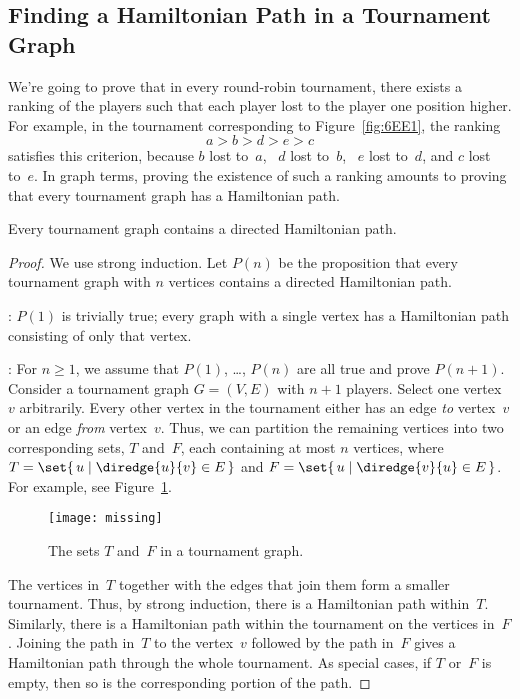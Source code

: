 \subsection{Finding a Hamiltonian Path in a Tournament Graph}

We're going to prove that in every round-robin tournament, there
exists a ranking of the players such that each player lost to the
player one position higher.  For example, in the tournament
corresponding to Figure~\ref{fig:6EE1}, the ranking
\begin{equation*}
    a > b > d > e > c
\end{equation*}
satisfies this criterion, because $b$ lost to~$a$, \ $d$ lost to~$b$,
\ $e$ lost to~$d$, and $c$ lost to~$e$.  In graph terms, proving the
existence of such a ranking amounts to proving that every tournament
graph has a Hamiltonian path.

\begin{theorem}\label{thm:hamilton_tournament}
Every tournament graph contains a directed Hamiltonian path.
\end{theorem}

\begin{proof}

We use strong induction.  Let $P(n)$ be the proposition that every
tournament graph with $n$ vertices contains a directed Hamiltonian
path.

: $P(1)$ is trivially true; every graph with
a single vertex has a Hamiltonian path consisting of only that vertex.

: For $n \ge 1$, we assume that $P(1)$,
\dots, $P(n)$ are all true and prove $P(n + 1)$.  Consider a
tournament graph $G = (V, E)$ with $n + 1$ players.  Select one
vertex~$v$ arbitrarily.  Every other vertex in the tournament either
has an edge \emph{to} vertex~$v$ or an edge \emph{from} vertex~$v$.
Thus, we can partition the remaining vertices into two corresponding
sets, $T$ and~$F$, each containing at most $n$ vertices, where $T =
\set{\, u \mid \diredge{u}{v} \in E \,}$ and
$F = \set{\, u \mid \diredge{v}{u} \in E \,}$.
For example, see Figure~\ref{fig:6EE2}.

\begin{figure}


\texttt{[image: missing]}

\caption{The sets $T$ and~$F$ in a tournament graph.}

\label{fig:6EE2}

\end{figure}

The vertices in~$T$ together with the edges that join them form a
smaller tournament.  Thus, by strong induction, there is a Hamiltonian
path within~$T$.  Similarly, there is a Hamiltonian path within the
tournament on the vertices in~$F$.  Joining the path in~$T$ to the
vertex~$v$ followed by the path in~$F$ gives a Hamiltonian path
through the whole tournament.  As special cases, if $T$ or~$F$ is
empty, then so is the corresponding portion of the path.
\end{proof}

